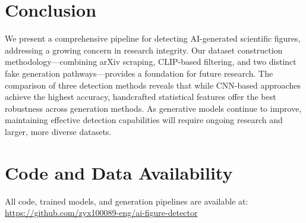 \documentclass[11pt]{article}
\begin{document}
\section{Conclusion}

We present a comprehensive pipeline for detecting AI-generated scientific figures, addressing a growing concern in research integrity. Our dataset construction methodology---combining arXiv scraping, CLIP-based filtering, and two distinct fake generation pathways---provides a foundation for future research. The comparison of three detection methods reveals that while CNN-based approaches achieve the highest accuracy, handcrafted statistical features offer the best robustness across generation methods. As generative models continue to improve, maintaining effective detection capabilities will require ongoing research and larger, more diverse datasets.

\section*{Code and Data Availability}

All code, trained models, and generation pipelines are available at:
\url{https://github.com/zyx100089-eng/ai-figure-detector}



\end{document}
